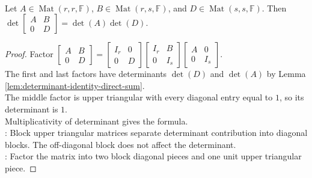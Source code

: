 \begin{theorem} \label{thm:block-upper-triangular-determinant} \\
Let $A\in\operatorname{Mat}(r,r,\mathbb{F})$, $B\in\operatorname{Mat}(r,s,\mathbb{F})$, and $D\in\operatorname{Mat}(s,s,\mathbb{F})$. Then $\det
\begin{bmatrix}
A & B\\
0 & D
\end{bmatrix}
=\det(A)\det(D)$.
\begin{proof}
Factor $\begin{bmatrix}
A & B\\
0 & D
\end{bmatrix}
=
\begin{bmatrix}
I_r & 0\\
0 & D
\end{bmatrix}
\begin{bmatrix}
I_r & B\\
0 & I_s
\end{bmatrix}
\begin{bmatrix}
A & 0\\
0 & I_s
\end{bmatrix}$.\\
The first and last factors have determinants $\det(D)$ and $\det(A)$ by Lemma \ref{lem:determinant-identity-direct-sum}.\\
The middle factor is upper triangular with every diagonal entry equal to $1$, so its determinant is $1$.\\
Multiplicativity of determinant gives the formula.\\
: Block upper triangular matrices separate determinant contribution into diagonal blocks. The off-diagonal block does not affect the determinant.\\
: Factor the matrix into two block diagonal pieces and one unit upper triangular piece.
\end{proof}
\end{theorem}

